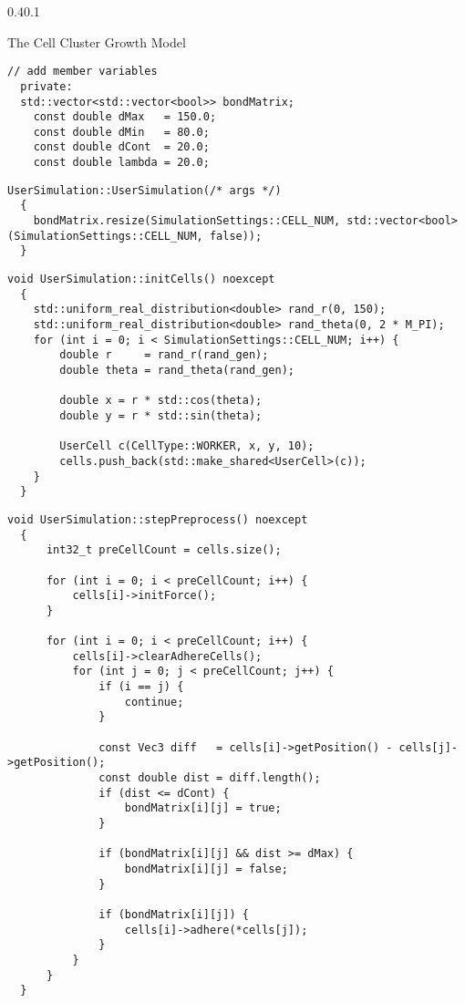 \documentclass[vipdfmx,a4paper,11pt]{jsarticle}
\makeatletter
\renewcommand{\subsubsection}{%
  \@startsection{subsubsection}{1}{\z@}%
  {0.4\Cvs}{0.1\Cvs}%
  {\normalfont\large\headfont\raggedright}}
\makeatother
\begin{document}
\subsubsection{The Cell Cluster Growth Model}
\begin{lstlisting}[caption=UserSimulation.hpp]
  // add member variables
  private:
  std::vector<std::vector<bool>> bondMatrix;
    const double dMax   = 150.0;
    const double dMin   = 80.0;
    const double dCont  = 20.0;
    const double lambda = 20.0;
\end{lstlisting}

\begin{lstlisting}[caption=UserSimulation()]
  UserSimulation::UserSimulation(/* args */)
  {
    bondMatrix.resize(SimulationSettings::CELL_NUM, std::vector<bool>(SimulationSettings::CELL_NUM, false));
  }
\end{lstlisting}

\begin{lstlisting}[caption=initCells()]
  void UserSimulation::initCells() noexcept
  {
    std::uniform_real_distribution<double> rand_r(0, 150);
    std::uniform_real_distribution<double> rand_theta(0, 2 * M_PI);
    for (int i = 0; i < SimulationSettings::CELL_NUM; i++) {
        double r     = rand_r(rand_gen);
        double theta = rand_theta(rand_gen);

        double x = r * std::cos(theta);
        double y = r * std::sin(theta);

        UserCell c(CellType::WORKER, x, y, 10);
        cells.push_back(std::make_shared<UserCell>(c));
    }
  }
\end{lstlisting}

\begin{lstlisting}[caption=stepPreprocess()]
  void UserSimulation::stepPreprocess() noexcept
  {
      int32_t preCellCount = cells.size();
  
      for (int i = 0; i < preCellCount; i++) {
          cells[i]->initForce();
      }
  
      for (int i = 0; i < preCellCount; i++) {
          cells[i]->clearAdhereCells();
          for (int j = 0; j < preCellCount; j++) {
              if (i == j) {
                  continue;
              }
  
              const Vec3 diff   = cells[i]->getPosition() - cells[j]->getPosition();
              const double dist = diff.length();
              if (dist <= dCont) {
                  bondMatrix[i][j] = true;
              }
  
              if (bondMatrix[i][j] && dist >= dMax) {
                  bondMatrix[i][j] = false;
              }
  
              if (bondMatrix[i][j]) {
                  cells[i]->adhere(*cells[j]);
              }
          }
      }
  }
\end{lstlisting}
\end{document}
